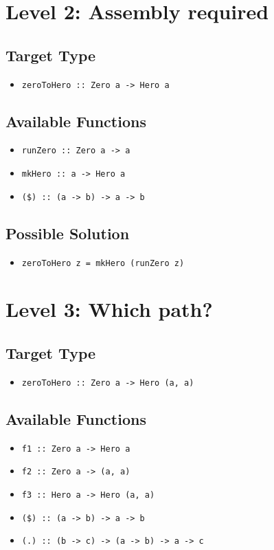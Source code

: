 \section{Level 2: Assembly required}

\subsection*{Target Type} 
\begin{itemize}
    \item \texttt{zeroToHero :: Zero a -> Hero a}
\end{itemize}

\subsection*{Available Functions} 
\begin{itemize}
    \item \texttt{runZero :: Zero a -> a}
    \item \texttt{mkHero :: a -> Hero a}
    \item \texttt{(\$) :: (a -> b) -> a -> b}
\end{itemize}

\subsection*{Possible Solution} 
\begin{itemize}
    \item \texttt{zeroToHero z = mkHero (runZero z)}
\end{itemize}

\section{Level 3: Which path?}
\subsection*{Target Type } 
\begin{itemize}
    \item \texttt{zeroToHero :: Zero a -> Hero (a, a)}
\end{itemize}

\subsection*{Available Functions} 
\begin{itemize}
    \item \texttt{f1 :: Zero a -> Hero a}
    \item \texttt{f2 :: Zero a -> (a, a)}
    \item \texttt{f3 :: Hero a -> Hero (a, a)}
    \item \texttt{(\$) :: (a -> b) -> a -> b}
    \item \texttt{(.) :: (b -> c) -> (a -> b) -> a -> c}
\end{itemize}

